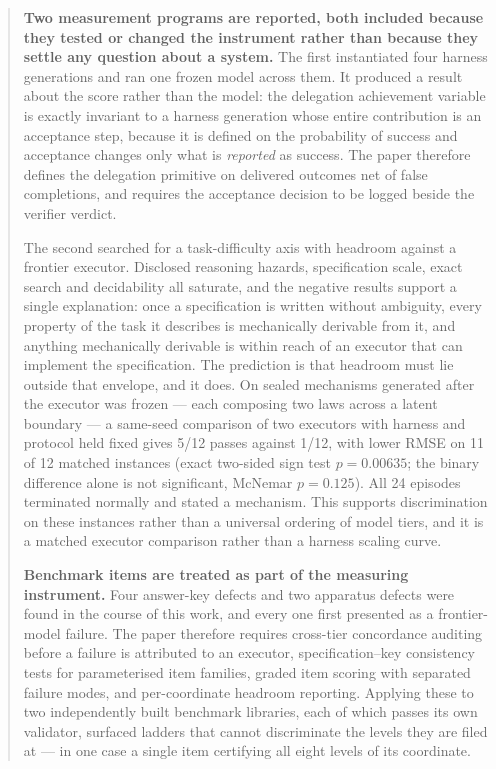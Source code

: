 \documentclass[11pt]{article}
\theoremstyle{definition}
\begin{document}
\begin{abstract}
\medskip
\noindent\textbf{Two measurement programs are reported, both included because they tested or changed the instrument rather than because they settle any question about a system.} The first instantiated four harness generations and ran one frozen model across them. It produced a result about the score rather than the model: the delegation achievement variable is exactly invariant to a harness generation whose entire contribution is an acceptance step, because it is defined on the probability of success and acceptance changes only what is \emph{reported} as success. The paper therefore defines the delegation primitive on delivered outcomes net of false completions, and requires the acceptance decision to be logged beside the verifier verdict.

The second searched for a task-difficulty axis with headroom against a frontier executor. Disclosed reasoning hazards, specification scale, exact search and decidability all saturate, and the negative results support a single explanation: once a specification is written without ambiguity, every property of the task it describes is mechanically derivable from it, and anything mechanically derivable is within reach of an executor that can implement the specification. The prediction is that headroom must lie outside that envelope, and it does. On sealed mechanisms generated after the executor was frozen --- each composing two laws across a latent boundary --- a same-seed comparison of two executors with harness and protocol held fixed gives 5/12 passes against 1/12, with lower RMSE on 11 of 12 matched instances (exact two-sided sign test $p=0.00635$; the binary difference alone is not significant, McNemar $p=0.125$). All 24 episodes terminated normally and stated a mechanism. This supports discrimination on these instances rather than a universal ordering of model tiers, and it is a matched executor comparison rather than a harness scaling curve.

\medskip
\noindent\textbf{Benchmark items are treated as part of the measuring instrument.} Four answer-key defects and two apparatus defects were found in the course of this work, and every one first presented as a frontier-model failure. The paper therefore requires cross-tier concordance auditing before a failure is attributed to an executor, specification--key consistency tests for parameterised item families, graded item scoring with separated failure modes, and per-coordinate headroom reporting. Applying these to two independently built benchmark libraries, each of which passes its own validator, surfaced ladders that cannot discriminate the levels they are filed at --- in one case a single item certifying all eight levels of its coordinate.


\end{abstract}
\end{document}
